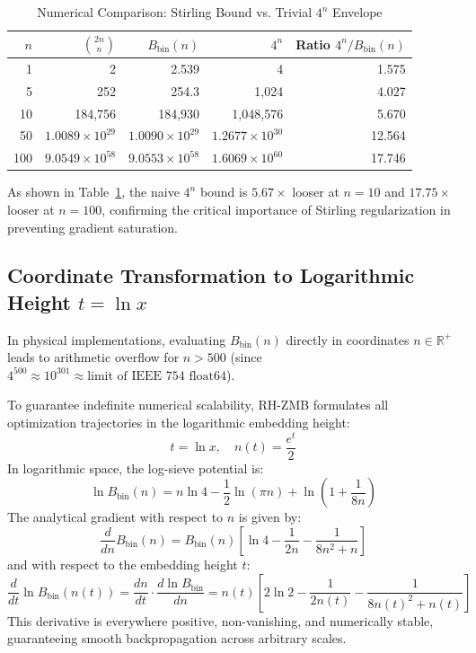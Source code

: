 \documentclass[11pt,a4paper]{article}
\theoremstyle{definition}
\theoremstyle{remark}
\begin{document}
\begin{table}[h]
\centering
\caption{Numerical Comparison: Stirling Bound vs. Trivial $4^n$ Envelope}
\label{tab:stirling_vs_4n}
\small
\begin{tabular}{rrrrr}
\toprule
$n$ & $\binom{2n}{n}$ & $B_{\mathrm{bin}}(n)$ & $4^n$ & Ratio $4^n / B_{\mathrm{bin}}(n)$ \\
\midrule
1   & 2                   & 2.539                 & 4             & 1.575 \\
5   & 252                 & 254.3                 & 1,024         & 4.027 \\
10  & 184,756             & 184,930               & 1,048,576     & 5.670 \\
50  & $1.0089 \times 10^{29}$ & $1.0090 \times 10^{29}$ & $1.2677 \times 10^{30}$ & 12.564 \\
100 & $9.0549 \times 10^{58}$ & $9.0553 \times 10^{58}$ & $1.6069 \times 10^{60}$ & 17.746 \\
\bottomrule
\end{tabular}
\end{table}

As shown in Table~\ref{tab:stirling_vs_4n}, the naive $4^n$ bound is $5.67\times$ looser at $n=10$ and $17.75\times$ looser at $n=100$, confirming the critical importance of Stirling regularization in preventing gradient saturation.

\subsection{Coordinate Transformation to Logarithmic Height \texorpdfstring{$t = \ln x$}{t = ln x}}
In physical implementations, evaluating $B_{\mathrm{bin}}(n)$ directly in coordinates $n \in \mathbb{R}^+$ leads to arithmetic overflow for $n > 500$ (since $4^{500} \approx 10^{301} \approx \text{limit of IEEE 754 float64}$).

To guarantee indefinite numerical scalability, RH-ZMB formulates all optimization trajectories in the logarithmic embedding height:
\begin{equation}
t = \ln x, \quad n(t) = \frac{e^t}{2}
\end{equation}
In logarithmic space, the log-sieve potential is:
\begin{equation}
\ln B_{\mathrm{bin}}(n) = n \ln 4 - \frac{1}{2}\ln(\pi n) + \ln\left(1 + \frac{1}{8n}\right)
\end{equation}
The analytical gradient with respect to $n$ is given by:
\begin{equation}
\frac{d}{dn} B_{\mathrm{bin}}(n) = B_{\mathrm{bin}}(n) \left[ \ln 4 - \frac{1}{2n} - \frac{1}{8n^2 + n} \right]
\end{equation}
and with respect to the embedding height $t$:
\begin{equation}
\frac{d}{dt} \ln B_{\mathrm{bin}}(n(t)) = \frac{d n}{dt} \cdot \frac{d \ln B_{\mathrm{bin}}}{dn} = n(t) \left[ 2\ln 2 - \frac{1}{2n(t)} - \frac{1}{8n(t)^2 + n(t)} \right]
\end{equation}
This derivative is everywhere positive, non-vanishing, and numerically stable, guaranteeing smooth backpropagation across arbitrary scales.
\end{document}
